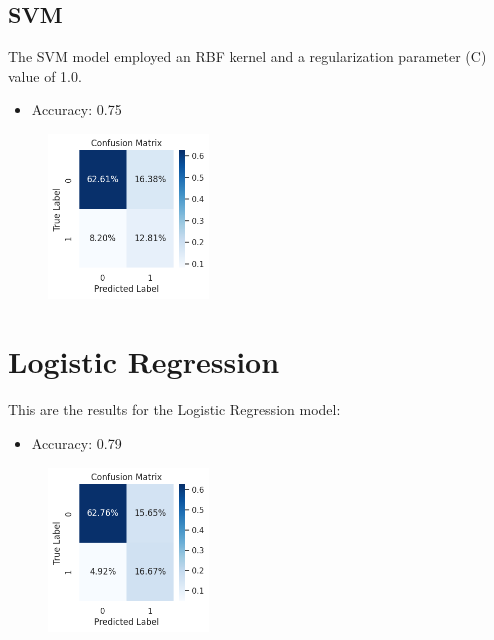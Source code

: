 \documentclass{article}
\begin{document}
\subsection{SVM}\label{subsec:svm}
The SVM model employed an RBF kernel and a regularization parameter (C) value of 1.0.
\begin{itemize}
\item Accuracy: 0.75
\end{itemize}
\begin{figure}[h!]    
    \includegraphics[width=0.38\textwidth]{svm_cm.png}    
    \label{fig:svm_cm}
\end{figure}

\newpage

\section{Logistic Regression}\label{sec:reg}
This are the results for the Logistic Regression model:
\begin{itemize}
\item Accuracy: 0.79
\end{itemize}
\begin{figure}[h!]    
    \includegraphics[width=0.38\textwidth]{reg_cm.png}    
    \label{fig:reg_cm}
\end{figure}
\end{document}
